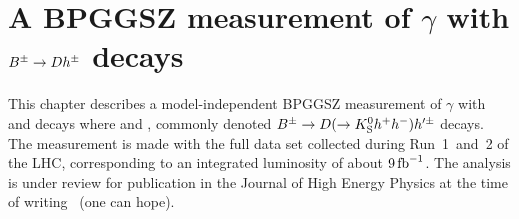 

\chapter{\texorpdfstring{A BPGGSZ measurement of $\gamma$ with ${{B}^\pm}\rightarrow{\ensuremath{D}} h^\pm$ decays}{A BPGGSZ measurement of gamma with B->Dh decays}}
\label{ch:5-GGSZ-measurement}


This chapter describes a model-independent BPGGSZ measurement of $\gamma$ with \BtoDK and \BtoDpi decays where \DtoKspipi and \DtoKsKK, commonly denoted ${{B}^\pm}\rightarrow{\ensuremath{D}}(\rightarrow{\ensuremath{{K}^0_{\mathrm{S}}}} h^+h^-)h'^\pm$ decays. The measurement is made with the full \lhcb data set collected during Run~1~and~2 of the LHC, corresponding to an integrated luminosity of about $9\text{\,fb}^{-1}$. The analysis is under review for publication in the Journal of High Energy Physics at the time of writing~\cite{GGSZ-B2Dh} (one can hope).






